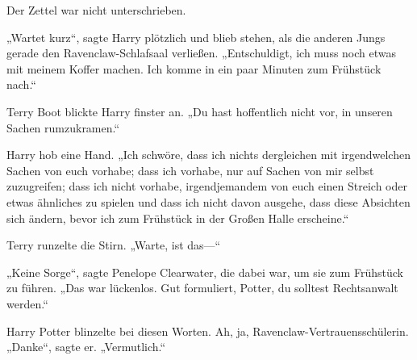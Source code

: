 \begin{writtenNote}
\end{writtenNote}

Der Zettel war nicht unterschrieben.

\later

„Wartet kurz“, sagte Harry plötzlich und blieb stehen, als die anderen Jungs gerade den Ravenclaw-Schlafsaal verließen. „Entschuldigt, ich muss noch etwas mit meinem Koffer machen. Ich komme in ein paar Minuten zum Frühstück nach.“

Terry Boot blickte Harry finster an. „Du hast hoffentlich nicht vor, in unseren Sachen rumzukramen.“

Harry hob eine Hand. „Ich schwöre, dass ich nichts dergleichen mit irgendwelchen Sachen von euch vorhabe; dass ich vorhabe, nur auf Sachen von mir selbst zuzugreifen; dass ich nicht vorhabe, irgendjemandem von euch einen Streich oder etwas ähnliches zu spielen und dass ich nicht davon ausgehe, dass diese Absichten sich ändern, bevor ich zum Frühstück in der Großen Halle erscheine.“

Terry runzelte die Stirn. „Warte, ist das—“

„Keine Sorge“, sagte Penelope Clearwater, die dabei war, um sie zum Frühstück zu führen. „Das war lückenlos. Gut formuliert, Potter, du solltest Rechtsanwalt werden.“

Harry Potter blinzelte bei diesen Worten. Ah, ja, Ravenclaw-Vertrauensschülerin. „Danke“, sagte er. „Vermutlich.“

